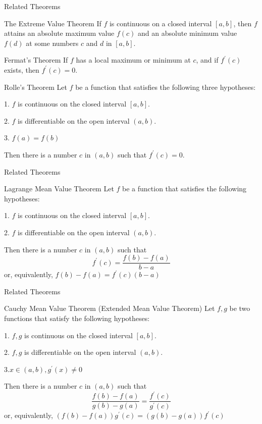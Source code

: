 \documentclass{beamer}
\begin{document}
\begin{frame}{Related Theorems}
    \begin{block}{The Extreme Value Theorem}
If $f$ is continuous on a closed interval $[a, b]$, then $f$ attains an absolute maximum value $f(c)$ and an absolute minimum value $f(d)$ at some numbers $c$ and $d$ in $[a, b]$.
    \end{block}
    \begin{block}{Fermat's Theorem}
If $f$ has a local maximum or minimum at $c$, and if $f^{\prime}(c)$ exists, then $f^{\prime}(c)=0$.
    \end{block}
    \begin{block}{Rolle's Theorem}
 Let $f$ be a function that satisfies the following three hypotheses:
 
1. $f$ is continuous on the closed interval $[a, b]$.

2. $f$ is differentiable on the open interval $(a, b)$.

3. $f(a)=f(b)$

Then there is a number $c$ in $(a, b)$ such that $f^{\prime}(c)=0$.
    \end{block}
\end{frame}
\begin{frame}{Related Theorems}
    \begin{block}{Lagrange Mean Value Theorem }
Let $f$ be a function that satisfies the following hypotheses:

1. $f$ is continuous on the closed interval $[a, b]$.

2. $f$ is differentiable on the open interval $(a, b)$.

Then there is a number $c$ in $(a, b)$ such that
$$
f^{\prime}(c)=\frac{f(b)-f(a)}{b-a}
$$
or, equivalently,
$f(b)-f(a)=f^{\prime}(c)(b-a)$
    \end{block}
\end{frame}
\begin{frame}{Related Theorems}
    \begin{block}{Cauchy Mean Value Theorem (Extended Mean Value Theorem) }
Let $f,g$ be two functions that satisfy the following hypotheses:

1. $f,g$ is continuous on the closed interval $[a, b]$.

2. $f,g$ is differentiable on the open interval $(a, b)$.

3.$x \in(a, b), g^{\prime}(x) \neq 0$

Then there is a number $c$ in $(a, b)$ such that
$$
\frac{f(b)-f(a)}{g(b)-g(a)}=\frac{f^{\prime}(c)}{g^{\prime}(c)}
$$
or, equivalently,
$(f(b)-f(a)) g^{\prime}(c)=(g(b)-g(a)) f^{\prime}(c)$
    \end{block}
\end{frame}
\end{document}
